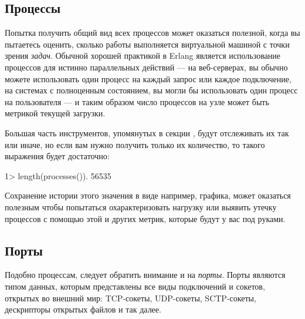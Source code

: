 \subsection{Процессы}
\label{subsec:global-procs}

Попытка получить общий вид всех процессов может оказаться полезной, когда вы пытаетесь оценить, сколько работы выполняется виртуальной машиной с точки зрения \emph{задач}. Обычной хорошей практикой в Erlang является использование процессов для истинно параллельных действий --- на веб-серверах, вы обычно можете использовать один процесс на каждый запрос или каждое подключение, на системах с полноценным состоянием, вы могли бы использовать один процесс на пользователя --- и таким образом число процессов на узле может быть метрикой текущей загрузки.

Большая часть инструментов, упомянутых в секции , будут отслеживать их так или иначе, но если вам нужно получить только их количество, то такого выражения будет достаточно:

\begin{VerbatimEshell}
1> length(processes()).
56535
\end{VerbatimEshell}

Сохранение истории этого значения в виде например, графика, может оказаться полезным чтобы попытаться охарактеризовать нагрузку или выявить утечку процессов с помощью этой и других метрик, которые будут у вас под руками.


\subsection{Порты}
\label{subsec:global-ports}

Подобно процессам, следует обратить внимание и на \emph{порты}. Порты являются типом данных, которым представлены все виды подключений и сокетов, открытых во внешний мир: TCP-сокеты, UDP-сокеты, SCTP-сокеты, дескрипторы открытых файлов и так далее.

